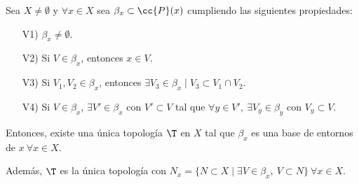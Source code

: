 \begin{teo}\label{teo:TopGenerada_BasesEntornos}
    Sea $X\neq \emptyset$ y $\forall x\in X$ sea $\beta_x\subset \cc{P}(x)$ cumpliendo las siguientes propiedades:  
    \begin{enumerate}
    \item[V1)] $\beta_x\neq \emptyset$.
    \item[V2)] Si $V\in \beta_x$, entonces $x\in V$.
    \item[V3)] Si $V_1,V_2\in \beta_x$, entonces $\exists V_3\in \beta_x\mid V_3\subset V_1\cap V_2$.

    \item[V4)] Si $V\in \beta_x$, $\exists V'\in \beta_x$ con $V'\subset V$ tal que $\forall y\in V',~\exists V_y\in \beta_y$ con $V_y\subset V$.
\end{enumerate}

Entonces, existe una única topología $\T$ en $X$ tal que $\beta_x$ es una base de entornos de $x~\forall x\in X$.

Además, $\T$ es la única topología con $N_x=\{N\subset X\mid \exists V\in \beta_x,~V\subset N\} ~\forall x\in X$.
\end{teo}
